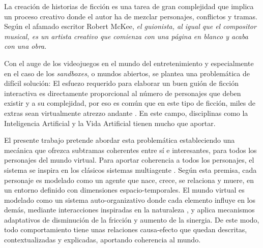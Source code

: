 




\begin{resumen}        %



La creación de historias de ficción es una tarea de gran complejidad que implica un proceso creativo donde el autor ha de mezclar personajes, conflictos y tramas. Según el afamado escritor Robert McKee,
\textit{el guionista, al igual que el compositor musical, es un artista creativo que comienza con una página en blanco y acaba con una obra}.



Con el auge de los videojuegos en el mundo del entretenimiento
y especialmente en el caso de los \textit{sandboxes}, o mundos abiertos, se plantea una problemática de difícil solución: El esfuezo requerido para elaborar un buen guión de ficción interactiva es directamente proporcional al número de personajes que deben existir y a su complejidad, por eso es común que en este tipo de ficción, miles de extras sean virtualmente atrezzo andante
. En este campo, disciplinas como la Inteligencia Artificial y la Vida Artificial tienen mucho que aportar.


El presente trabajo pretende abordar esta problemática estableciendo una mecánica que ofrezca subtramas coherentes entre sí e interesantes, para todos los personajes del mundo virtual.
Para aportar coherencia a todos los personajes, el sistema se inspira en los clásicos sistemas multiagente
. Según esta premisa, cada personaje es modelado como un agente que nace, crece, se relaciona y muere, en un entorno definido con dimensiones espacio-temporales. El mundo virtual es modelado como un sistema auto-organizativo donde cada elemento influye en los demás, mediante interacciones inspiradas en la naturaleza
, y aplica mecanismos adaptativos de disminución de la fricción y aumento de la sinergia. De este modo, todo comportamiento tiene unas relaciones causa-efecto que quedan descritas, contextualizadas y explicadas, aportando coherencia al mundo.


\end{resumen}
